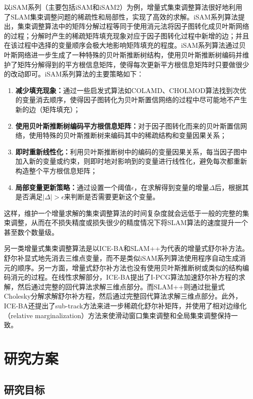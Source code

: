 \documentclass[oneside]{ZJUthesis}
\begin{document}
以iSAM系列（主要包括iSAM\citep{kaess2008isam}和iSAM2\citep{kaess2012isam2}）为例，增量式集束调整算法很好地利用了SLAM集束调整问题的稀疏性和局部性，实现了高效的求解。iSAM系列算法提出，集束调整算法中的矩阵分解过程等同于使用消元法将因子图转化成贝叶斯网络的过程；分解时产生的稀疏矩阵填充现象对应于因子图转化过程中新增的边；并且在该过程中选择的变量顺序会极大地影响矩阵填充的程度。iSAM系列算法通过贝叶斯网络进一步生成了一种特殊的贝叶斯推断树结构，使用贝叶斯推断树编码并维护了矩阵分解得到的平方根信息矩阵，使得每次更新平方根信息矩阵时只要做很少的改动即可。iSAM系列算法的主要策略如下：
\begin{enumerate}
    \item \textbf{减少填充现象：}通过一些启发式算法如COLAMD\citep{davis2004algorithm}、CHOLMOD\citep{chen2008algorithm}算法找到次优的变量消去顺序，使得因子图转化为贝叶斯置信网络的过程中尽可能地不产生新的边（矩阵填充）；
    \item \textbf{使用贝叶斯推断树编码平方根信息矩阵：}对于因子图转化而来的贝叶斯置信网络，使用特殊的贝叶斯推断树来编码其中的稀疏结构和变量因果关系；
    \item \textbf{即时重新线性化：}利用贝叶斯推断树中的编码的变量因果关系，每当因子图中加入新的变量或约束，则即时地对影响到的变量进行线性化，避免每次都重新构造整个平方根信息矩阵；
    \item \textbf{局部变量更新策略：}通过设置一个阈值$\epsilon$，在求解得到变量的增量$\Delta$后，根据其是否满足$|\Delta|>\epsilon$来判断是否需要更新这个变量。
\end{enumerate}
这样，维护一个增量求解的集束调整算法的时间复杂度就会远低于一般的完整的集束调整，从而在不损失精度或损失很少的精度情况下将SLAM算法的速度提升一个甚至数个数量级。

另一类增量式集束调整算法是以ICE-BA\citep{liu2018ice}和SLAM++为代表的增量式舒尔补方法。舒尔补显式地先消去三维点变量，而不是类似iSAM系列算法使用程序自动生成消元的顺序。另一方面，增量式舒尔补方法也没有使用贝叶斯推断树或类似的结构编码消元的过程。在线性求解部分，ICE-BA提出了I-PCG算法加速舒尔补方程的求解，然后通过完整的回代算法求解三维点部分。而SLAM++则通过批量式Cholesky分解求解舒尔补方程，然后通过完整回代算法求解三维点部分。此外，ICE-BA还提出了sub-track方法来进一步稀疏化舒尔补矩阵，并使用了相对边缘化（relative marginalization）方法来使滑动窗口集束调整和全局集束调整保持一致。

\chapter{研究方案}

\section{研究目标}
\end{document}
